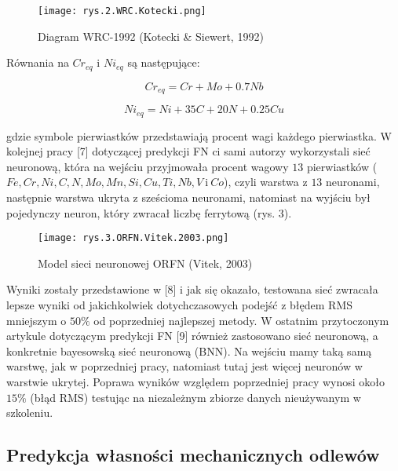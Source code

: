 \begin{figure}[h]
    \centering
    \texttt{[image: rys.2.WRC.Kotecki.png]}
    \caption{Diagram WRC-1992 (Kotecki \& Siewert, 1992)}
    \label{fig:mesh2}
\end{figure}

Równania na  $Cr_{eq}$ i $Ni_{eq}$ są następujące:

\begin{equation}
Cr_{eq} = Cr + Mo + 0.7Nb
\end{equation}

\begin{equation}
Ni_{eq} = Ni+35C+20N+0.25Cu
\end{equation}

\noindent gdzie symbole pierwiastków przedstawiają procent wagi każdego pierwiastka.
W kolejnej pracy [7] dotyczącej predykcji FN ci sami autorzy wykorzystali sieć neuronową, która na wejściu przyjmowała procent wagowy $13$ pierwiastków ($Fe, Cr, Ni, C, N, Mo, Mn, Si, Cu, Ti, Nb, V~$i$~Co$), czyli warstwa z $13$ neuronami, następnie warstwa ukryta z sześcioma neuronami, natomiast na wyjściu był pojedynczy neuron, który zwracał liczbę ferrytową (rys. 3).

\begin{figure}[h]
    \centering
    \texttt{[image: rys.3.ORFN.Vitek.2003.png]}
    \caption{Model sieci neuronowej ORFN (Vitek, 2003)}
    \label{fig:mesh3}
\end{figure}

Wyniki zostały przedstawione w [8] i jak się okazało, testowana sieć zwracała lepsze wyniki od jakichkolwiek dotychczasowych podejść z błędem RMS mniejszym o $50\%$ od poprzedniej najlepszej metody. 
    W ostatnim przytoczonym artykule dotyczącym predykcji FN [9] również zastosowano sieć neuronową, a konkretnie bayesowską sieć neuronową (BNN). Na wejściu mamy taką samą warstwę, jak w poprzedniej pracy, natomiast tutaj jest więcej neuronów w warstwie ukrytej. Poprawa wyników względem poprzedniej pracy wynosi około $15\%$ (błąd RMS) testując na niezależnym zbiorze danych nieużywanym w szkoleniu.

\subsection{Predykcja własności mechanicznych odlewów}

